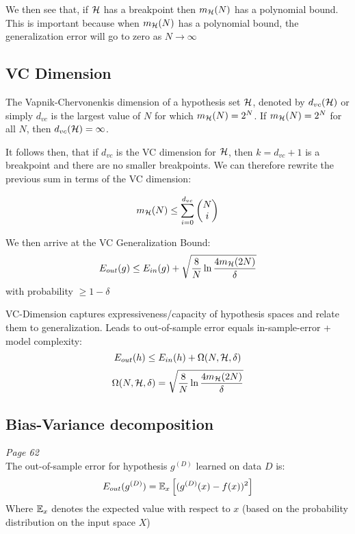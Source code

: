     We then see that, if $\mathcal{H}$ has a breakpoint then $m_{\mathcal{H}}(N)$ has a 
    polynomial bound. This is important because when $m_{\mathcal{H}}(N)$ has a 
    polynomial bound, the generalization error will go to zero as $N 
    \rightarrow \infty$
    
    \subsection{VC Dimension}
    The Vapnik-Chervonenkis dimension of a hypothesis set $\mathcal{H}$, denoted by 
    $d_{vc}(\mathcal{H})$ or simply $d_{vc}$ is the largest value of $N$ for which 
    $m_{\mathcal{H}}(N)=2^N$. If $m_{\mathcal{H}}(N)=2^N$ for all $N$, then $d_{vc}(\mathcal{H})=\infty$.
    
    It follows then, that if $d_{vc}$ is the VC dimension for $\mathcal{H}$, then $k = 
    d_{vc} + 1$ is a breakpoint and there are no smaller breakpoints. We can 
    therefore rewrite the previous sum in terms of the VC dimension:
    
    \begin{equation*}
        m_{\mathcal{H}}(N) \leq \sum_{i=0}^{d_{vc}} \begin{pmatrix}
        N\\i
        \end{pmatrix}
    \end{equation*}
    
    We then arrive at the VC Generalization Bound:
    \begin{equation}
        E_{out}(g) \leq E_{in}(g) + \sqrt{\frac{8}{N} \ln 
        \frac{4m_{\mathcal{H}}(2N)}{\delta}}
    \end{equation}
    with probability $\geq 1-\delta$
    
    VC-Dimension captures expressiveness/capacity of hypothesis spaces and 
    relate them to generalization. Leads to out-of-sample error equals 
    in-sample-error + model complexity:
    \begin{equation*}
    E_{out}(h) \leq E_{in}(h) + \Omega(N,\mathcal{H}, \delta)
    \end{equation*}
    \begin{equation*}
    \Omega(N, \mathcal{H}, \delta) = \sqrt{\frac{8}{N}\ln\frac{4m_{\mathcal{H}}(2N)}{\delta}}
    \end{equation*}
    
    \subsection{Bias-Variance decomposition}
    \textit{Page 62}\\
    The out-of-sample error for hypothesis $g^{(D)}$ learned on data $D$ is:
    \begin{equation*}
        E_{out}(g^{(D)}) = \mathbb{E}_x\left[(g^{(D)}(x)-f(x))^2\right]
    \end{equation*}
    Where $\mathbb{E}_x$ denotes the expected value with respect to $x$ (based on the 
    probability distribution on the input space $X$)
    
